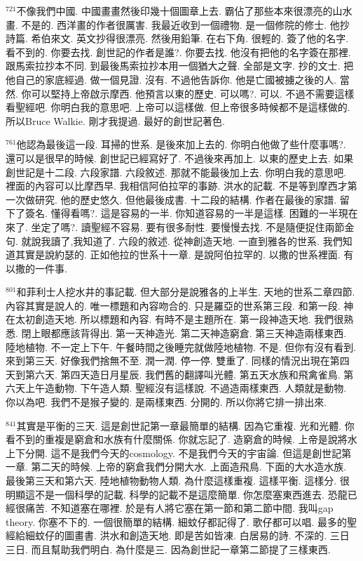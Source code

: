\documentclass{book}
\begin{document}
$^{721}$不像我們中國.
中國畫畫然後印幾十個圖章上去.
霸佔了那些本來很漂亮的山水畫.
不是的.
西洋畫的作者很厲害.
我最近收到一個禮物.
是一個修院的修士.
他抄詩篇.
希伯來文.
英文抄得很漂亮.
然後用鉛筆.
在右下角.
很輕的.
簽了他的名字.
看不到的.
你要去找.
創世記的作者是誰?.
你要去找.
他沒有把他的名字簽在那裡.
跟馬索拉抄本不同.
到最後馬索拉抄本用一個猶大之聲.
全部是文字.
抄的文士.
把他自己的家底經過.
做一個見證.
沒有.
不過他告訴你.
他是亡國被擄之後的人.
當然.
你可以堅持上帝啟示摩西.
他預言以東的歷史.
可以嗎?.
可以.
不過不需要這樣看聖經吧.
你明白我的意思吧.
上帝可以這樣做.
但上帝很多時候都不是這樣做的.
所以Bruce Walkie.
剛才我提過.
最好的創世記著色.

$^{761}$他認為最後這一段.
耳掃的世系.
是後來加上去的.
你明白他做了些什麼事嗎?.
還可以是很早的時候.
創世記已經寫好了.
不過後來再加上.
以東的歷史上去.
如果創世記是十二段.
六段家譜.
六段敘述.
那就不能最後加上去.
你明白我的意思吧.
裡面的內容可以比摩西早.
我相信阿伯拉罕的事跡.
洪水的記載.
不是等到摩西才第一次做研究.
他的歷史悠久.
但他最後成書.
十二段的結構.
作者在最後的家譜.
留下了簽名.
懂得看嗎?.
這是容易的一半.
你知道容易的一半是這樣.
困難的一半現在來了.
坐定了嗎?.
讀聖經不容易.
要有很多耐性.
要慢慢去找.
不是隨便捉住兩節金句.
就說我讀了,我知道了.
六段的敘述.
從神創造天地.
一直到雅各的世系.
我們知道其實是說約瑟的.
正如他拉的世系十一章.
是說阿伯拉罕的.
以撒的世系裡面.
有以撒的一件事.

$^{801}$和菲利士人挖水井的事記載.
但大部分是說雅各的上半生.
天地的世系二章四節.
內容其實是說人的.
唯一標題和內容吻合的.
只是羅亞的世系第三段.
和第一段.
神在太初創造天地.
所以標題和內容.
有時不是主題所在.
第一段神造天地.
我們很熟悉.
閉上眼都應該背得出.
第一天神造光.
第二天神造窮倉.
第三天神造兩樣東西.
陸地植物.
不一定上下午.
午餐時間之後睡完就做陸地植物.
不是.
但你有沒有看到.
來到第三天.
好像我們捨無不至.
潤一潤.
停一停.
雙重了.
同樣的情況出現在第四天到第六天.
第四天造日月星辰.
我們舊的翻譯叫光體.
第五天水族和飛禽雀鳥.
第六天上午造動物.
下午造人類.
聖經沒有這樣說.
不過造兩樣東西.
人類就是動物.
你以為吧.
我們不是猴子變的.
是兩樣東西.
分開的.
所以你將它排一排出來.

$^{841}$其實是平衡的三天.
這是創世記第一章最簡單的結構.
因為它重複.
光和光體.
你看不到的重複是窮倉和水族有什麼關係.
你就忘記了.
造窮倉的時候.
上帝是說將水上下分開.
這不是我們今天的cosmology.
不是我們今天的宇宙論.
但這是創世記第一章.
第二天的時候.
上帝的窮倉我們分開大水.
上面造飛鳥.
下面的大水造水族.
最後第三天和第六天.
陸地植物動物人類.
為什麼這樣重複.
這樣平衡.
這樣分.
很明顯這不是一個科學的記載.
科學的記載不是這麼簡單.
你怎麼塞東西進去.
恐龍已經很痛苦.
不知道塞在哪裡.
於是有人將它塞在第一節和第二節中間.
我叫gap theory.
你塞不下的.
一個很簡單的結構.
細蚊仔都記得了.
歌仔都可以唱.
最多的聖經給細蚊仔的圖畫書.
洪水和創造天地.
即是苦如皆凍.
白居易的詩.
不深的.
三日三日.
而且幫助我們明白.
為什麼是三.
因為創世記一章第二節提了三樣東西.
\end{document}
